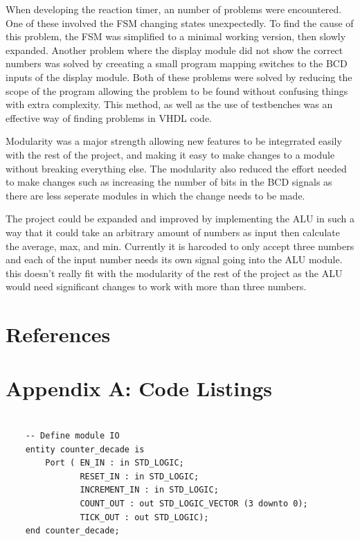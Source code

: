 \documentclass[11pt]{article}
\newenvironment{code}{\captionsetup{type=listing}}{}
\begin{document}
When developing the reaction timer, an number of problems were encountered. One of these involved the FSM changing states unexpectedly. To find the cause of this problem, the FSM was simplified to a minimal working version, then slowly expanded. Another problem where the display module did not show the correct numbers was solved by creeating a small program mapping switches to the BCD inputs of the display module. Both of these problems were solved by reducing the scope of the program allowing the problem to be found without confusing things with extra complexity. This method, as well as the use of testbenches was an effective way of finding problems in VHDL code.

Modularity was a major strength allowing new features to be integrrated easily with the rest of the project, and making it easy to make changes to a module without breaking everything else. The modularity also reduced the effort needed to make changes such as increasing the number of bits in the BCD signals as there are less seperate modules in which the change needs to be made.

The project could be expanded and improved by implementing the ALU in such a way that it could take an arbitrary amount of numbers as input then calculate the average, max, and min. Currently it is harcoded to only accept three numbers and each of the input number needs its own signal going into the ALU module. this doesn't really fit with the modularity of the rest of the project as the ALU would need significant changes to work with more than three numbers.

\newpage

\section{References}
\printbibliography

\newpage

\section{Appendix A: Code Listings}

\begin{code}
  \begin{verbatim}
  
    -- Define module IO
    entity counter_decade is
        Port ( EN_IN : in STD_LOGIC;
               RESET_IN : in STD_LOGIC;
               INCREMENT_IN : in STD_LOGIC;
               COUNT_OUT : out STD_LOGIC_VECTOR (3 downto 0);
               TICK_OUT : out STD_LOGIC);
    end counter_decade;

  \end{verbatim}
  \captionsetup{belowskip=0pt}
  \label{code:entity_naming_convention}
\end{code}
\end{document}
